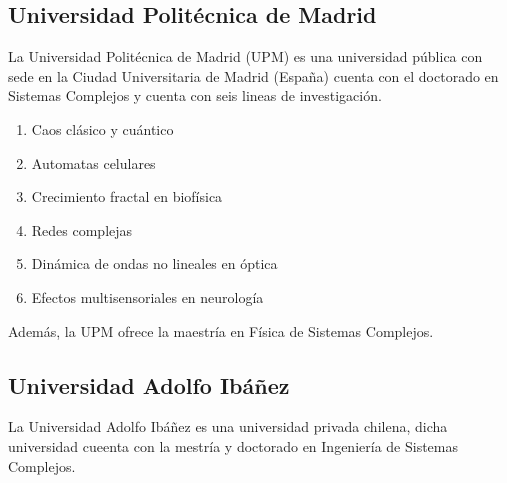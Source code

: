 \documentclass[a4paper,12pt]{article}
\begin{document}
\subsection{Universidad Politécnica de Madrid}
La Universidad Politécnica de Madrid (UPM) es una universidad pública con sede en la Ciudad Universitaria de Madrid (España) cuenta con el doctorado en Sistemas Complejos y cuenta con seis lineas de investigación.
\begin{enumerate}
 \item Caos clásico y cuántico
 \item Automatas celulares
 \item Crecimiento fractal en biofísica
 \item Redes complejas
 \item Dinámica de ondas no lineales en óptica
 \item Efectos multisensoriales en neurología
\end{enumerate}

Además, la UPM ofrece la maestría en Física de Sistemas Complejos.

\subsection{Universidad Adolfo Ibáñez}
La Universidad Adolfo Ibáñez es una universidad privada chilena, dicha universidad cueenta con la mestría y doctorado en Ingeniería de Sistemas Complejos.
\end{document}
